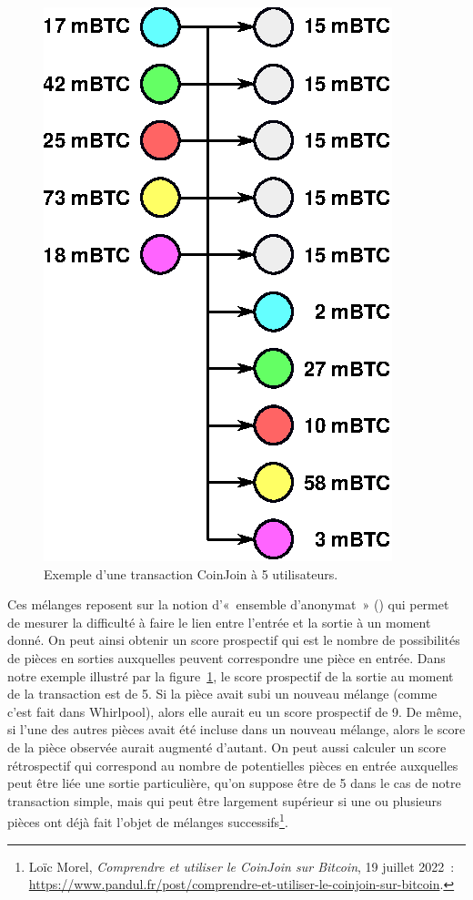 \begin{figure}[ht]
  \centering
  \includegraphics[scale=0.85]{img/coinjoin-transaction-5i-10o.eps}
  \caption{Exemple d'une transaction CoinJoin à 5 utilisateurs.}
  \label{fig:coinjoin-transaction}
\end{figure}

Ces mélanges reposent sur la notion d'«~ensemble d'anonymat~» () qui permet de mesurer la difficulté à faire le lien entre l'entrée et la sortie à un moment donné. On peut ainsi obtenir un score prospectif qui est le nombre de possibilités de pièces en sorties auxquelles peuvent correspondre une pièce en entrée. Dans notre exemple illustré par la figure~\ref{fig:coinjoin-transaction}, le score prospectif de la sortie au moment de la transaction est de 5. Si la pièce avait subi un nouveau mélange (comme c'est fait dans Whirlpool), alors elle aurait eu un score prospectif de 9. De même, si l'une des autres pièces avait été incluse dans un nouveau mélange, alors le score de la pièce observée aurait augmenté d'autant. On peut aussi calculer un score rétrospectif qui correspond au nombre de potentielles pièces en entrée auxquelles peut être liée une sortie particulière, qu'on suppose être de 5 dans le cas de notre transaction simple, mais qui peut être largement supérieur si une ou plusieurs pièces ont déjà fait l'objet de mélanges successifs\footnote{Loïc Morel, \emph{Comprendre et utiliser le CoinJoin sur Bitcoin}, 19 juillet 2022~: \url{https://www.pandul.fr/post/comprendre-et-utiliser-le-coinjoin-sur-bitcoin}.}.

